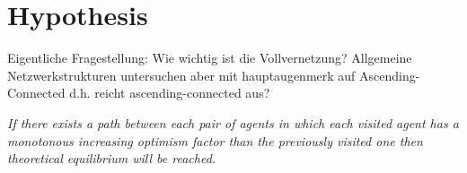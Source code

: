 \documentclass[Bachelorarbeit.tex]{subfiles}
\begin{document}
\chapter{Hypothesis}
Eigentliche Fragestellung: Wie wichtig ist die Vollvernetzung?
	Allgemeine Netzwerkstrukturen untersuchen aber mit hauptaugenmerk auf Ascending-Connected d.h. reicht ascending-connected aus?

\begin{center}
\textit{If there exists a path between each pair of agents in which each visited agent has a monotonous increasing optimism factor than the previously visited one then theoretical equilibrium will be reached.}
\end{center}
\end{document}

